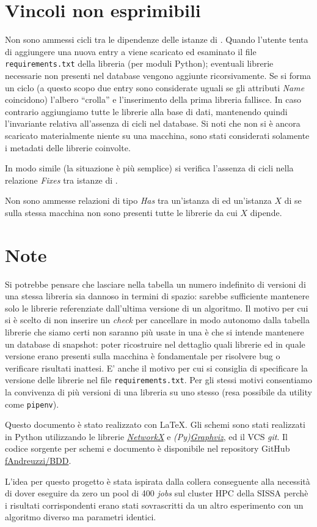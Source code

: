 \documentclass{article}
\begin{document}
\section{Vincoli non esprimibili}
Non sono ammessi cicli tra le dipendenze delle istanze di . Quando l'utente tenta di aggiungere una nuova entry a  viene scaricato ed esaminato il file \texttt{requirements.txt} della libreria (per moduli Python); eventuali librerie necessarie non presenti nel database vengono aggiunte ricorsivamente. Se si forma un ciclo (a questo scopo due entry sono considerate uguali se gli attributi \emph{Name} coincidono) l'albero ``crolla'' e l'inserimento della prima libreria fallisce. In caso contrario aggiungiamo tutte le librerie alla base di dati, mantenendo quindi l'invariante relativa all'assenza di cicli nel database. Si noti che non si è ancora scaricato materialmente niente su una macchina, sono stati considerati solamente i metadati delle librerie coinvolte.

In modo simile (la situazione è più semplice) si verifica l'assenza di cicli nella relazione \emph{Fixes} tra istanze di .

Non sono ammesse relazioni di tipo \emph{Has} tra un'istanza di  ed un'istanza $X$ di  se sulla stessa macchina non sono presenti tutte le librerie da cui $X$ dipende.

\section{Note}
Si potrebbe pensare che lasciare nella tabella  un numero indefinito di versioni di una stessa libreria sia dannoso in termini di spazio: sarebbe sufficiente mantenere solo le librerie referenziate dall'ultima versione di un algoritmo. Il motivo per cui si è scelto di non inserire un \emph{check} per cancellare in modo autonomo dalla tabella librerie che siamo certi non saranno più usate in una  è che si intende mantenere un database di snapshot: poter ricostruire nel dettaglio quali librerie ed in quale versione erano presenti sulla macchina è fondamentale per risolvere bug o verificare risultati inattesi. E' anche il motivo per cui si consiglia di specificare la versione delle librerie nel file \texttt{requirements.txt}. Per gli stessi motivi consentiamo la convivenza di più versioni di una libreria su uno stesso  (resa possibile da utility come \texttt{pipenv}).

Questo documento è stato realizzato con \LaTeX. Gli schemi sono stati realizzati in Python utilizzando le librerie \href{https://networkx.org/documentation/stable/index.html}{\emph{NetworkX}} e \emph{(Py)\href{http://www.graphviz.org/}{Graphviz}}, ed il VCS \emph{git}. Il codice sorgente per schemi e documento è disponibile nel repository GitHub \href{https://github.com/fAndreuzzi/BDD}{fAndreuzzi/BDD}.

L'idea per questo progetto è stata ispirata dalla collera conseguente alla necessità di dover eseguire da zero un pool di 400 \emph{jobs} sul cluster HPC della SISSA perchè i risultati corrispondenti erano stati sovrascritti da un altro esperimento con un algoritmo diverso ma parametri identici.
\end{document}
